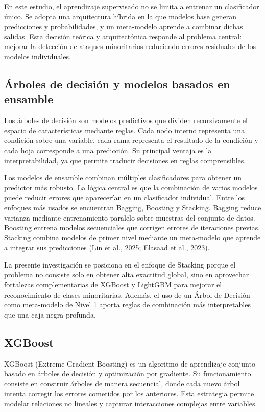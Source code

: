 \documentclass[12pt,a4paper]{article}
\begin{document}
En este estudio, el aprendizaje supervisado no se limita a entrenar un clasificador único. Se adopta una arquitectura híbrida en la que modelos base generan predicciones y probabilidades, y un meta-modelo aprende a combinar dichas salidas. Esta decisión teórica y arquitectónica responde al problema central: mejorar la detección de ataques minoritarios reduciendo errores residuales de los modelos individuales.

\subsection{Árboles de decisión y modelos basados en ensamble}

Los árboles de decisión son modelos predictivos que dividen recursivamente el espacio de características mediante reglas. Cada nodo interno representa una condición sobre una variable, cada rama representa el resultado de la condición y cada hoja corresponde a una predicción. Su principal ventaja es la interpretabilidad, ya que permite traducir decisiones en reglas comprensibles.

Los modelos de ensamble combinan múltiples clasificadores para obtener un predictor más robusto. La lógica central es que la combinación de varios modelos puede reducir errores que aparecerían en un clasificador individual. Entre los enfoques más usados se encuentran Bagging, Boosting y Stacking. Bagging reduce varianza mediante entrenamiento paralelo sobre muestras del conjunto de datos. Boosting entrena modelos secuenciales que corrigen errores de iteraciones previas. Stacking combina modelos de primer nivel mediante un meta-modelo que aprende a integrar sus predicciones (Lin et al., 2025; Elasaad et al., 2023).

La presente investigación se posiciona en el enfoque de Stacking porque el problema no consiste solo en obtener alta exactitud global, sino en aprovechar fortalezas complementarias de XGBoost y LightGBM para mejorar el reconocimiento de clases minoritarias. Además, el uso de un Árbol de Decisión como meta-modelo de Nivel 1 aporta reglas de combinación más interpretables que una caja negra profunda.

\subsection{XGBoost}

XGBoost (Extreme Gradient Boosting) es un algoritmo de aprendizaje conjunto basado en árboles de decisión y optimización por gradiente. Su funcionamiento consiste en construir árboles de manera secuencial, donde cada nuevo árbol intenta corregir los errores cometidos por los anteriores. Esta estrategia permite modelar relaciones no lineales y capturar interacciones complejas entre variables.
\end{document}
